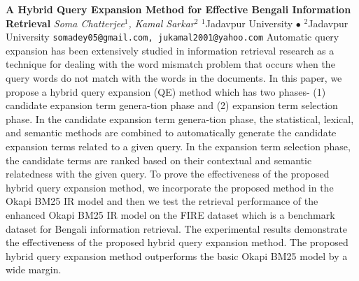 
    \begin{conf-abstract}[]
        {\textbf{A Hybrid Query Expansion Method for Effective Bengali Information Retrieval}}
        {\textit{Soma Chatterjee$^{1}$, Kamal Sarkar$^{2}$}}
        {$^{1}$Jadavpur University $\bullet$ $^{2}$Jadavpur University}
        {\texttt{somadey05@gmail.com, jukamal2001@yahoo.com}}
        {Automatic query expansion has been extensively studied in information retrieval research as a technique for dealing with the word mismatch problem that occurs when the query words do not match with the words in the documents. In this paper, we propose a hybrid query expansion (QE) method which has two phases- (1) candidate expansion term genera-tion phase and (2) expansion term selection phase. In the candidate expansion term genera-tion phase, the statistical, lexical, and semantic methods are combined to automatically generate the candidate expansion terms related to a given query.  In the expansion term selection phase, the candidate terms are ranked based on their contextual and semantic relatedness with the given query. To prove the effectiveness of the proposed hybrid query expansion method, we incorporate the proposed method in the Okapi BM25 IR model and then we test the retrieval performance of the enhanced Okapi BM25 IR model on the FIRE dataset which is a benchmark dataset for Bengali information retrieval. The experimental results demonstrate the effectiveness of the proposed hybrid query expansion method. The proposed hybrid query expansion method outperforms the basic Okapi BM25 model by a wide margin.}
    \end{conf-abstract}
        